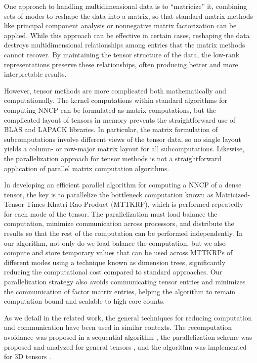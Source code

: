 One approach to handling multidimensional data is to ``matricize'' it, combining sets of modes to reshape the data into a matrix, so that standard matrix  methods like principal component analysis or nonnegative matrix factorization can be applied.
While this approach can be effective in certain cases, reshaping the data destroys multidimensional relationships among entries that the matrix methods cannot recover.
By maintaining the tensor structure of the data, the low-rank representations preserve these relationships, often producing better and more interpretable results.

However, tensor methods are more complicated both mathematically and computationally.
The kernel computations within standard algorithms for computing NNCP can be formulated as matrix computations, but the complicated layout of tensors in memory prevents the straightforward use of BLAS and LAPACK libraries.
In particular, the matrix formulation of subcomputations involve different views of the tensor data, so no single layout yields a column- or row-major matrix layout for all subcomputations.
Likewise, the parallelization approach for tensor methods is not a straightforward application of parallel matrix computation algorithms.

In developing an efficient parallel algorithm for computing a NNCP of a dense tensor, the key is to parallelize the bottleneck computation known as Matricized-Tensor Times Khatri-Rao Product (MTTKRP), which is performed repeatedly for each mode of the tensor.
The parallelization must load balance the computation, minimize communication across processors, and distribute the results so that the rest of the computation can be performed independently.
In our algorithm, not only do we load balance the computation, but we also compute and store temporary values that can be used across MTTKRPs of different modes using a technique known as dimension trees, significantly reducing the computational cost compared to standard approaches.
Our parallelization strategy also avoids communicating tensor entries and minimizes the communication of factor matrix entries, helping the algorithm to remain computation bound and scalable to high core counts.

As we detail in the related work, the general techniques for reducing computation and communication have been used in similar contexts.
The recomputation avoidance was proposed in a sequential algorithm \cite{PTC13a}, the parallelization scheme was proposed and analyzed for general tensors \cite{BKR17-TR}, and the algorithm was implemented for 3D tensors \cite{LK+17b}.

